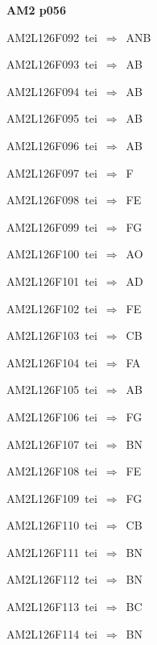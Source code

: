 \par\vfill\eject
{\bf\hfill AM2 p056\hfill\hbox{}}\par\bigskip
{\sixrm AM2L126F092\ {\sixit tei}\ }$\Rightarrow$\ ANB\par\smallskip
{\sixrm AM2L126F093\ {\sixit tei}\ }$\Rightarrow$\ AB\par\smallskip
{\sixrm AM2L126F094\ {\sixit tei}\ }$\Rightarrow$\ AB\par\smallskip
{\sixrm AM2L126F095\ {\sixit tei}\ }$\Rightarrow$\ AB\par\smallskip
{\sixrm AM2L126F096\ {\sixit tei}\ }$\Rightarrow$\ AB\par\smallskip
{\sixrm AM2L126F097\ {\sixit tei}\ }$\Rightarrow$\ F\par\smallskip
{\sixrm AM2L126F098\ {\sixit tei}\ }$\Rightarrow$\ FE\par\smallskip
{\sixrm AM2L126F099\ {\sixit tei}\ }$\Rightarrow$\ FG\par\smallskip
{\sixrm AM2L126F100\ {\sixit tei}\ }$\Rightarrow$\ AO\par\smallskip
{\sixrm AM2L126F101\ {\sixit tei}\ }$\Rightarrow$\ AD\par\smallskip
{\sixrm AM2L126F102\ {\sixit tei}\ }$\Rightarrow$\ FE\par\smallskip
{\sixrm AM2L126F103\ {\sixit tei}\ }$\Rightarrow$\ CB\par\smallskip
{\sixrm AM2L126F104\ {\sixit tei}\ }$\Rightarrow$\ FA\par\smallskip
{\sixrm AM2L126F105\ {\sixit tei}\ }$\Rightarrow$\ AB\par\smallskip
{\sixrm AM2L126F106\ {\sixit tei}\ }$\Rightarrow$\ FG\par\smallskip
{\sixrm AM2L126F107\ {\sixit tei}\ }$\Rightarrow$\ BN\par\smallskip
{\sixrm AM2L126F108\ {\sixit tei}\ }$\Rightarrow$\ FE\par\smallskip
{\sixrm AM2L126F109\ {\sixit tei}\ }$\Rightarrow$\ FG\par\smallskip
{\sixrm AM2L126F110\ {\sixit tei}\ }$\Rightarrow$\ CB\par\smallskip
{\sixrm AM2L126F111\ {\sixit tei}\ }$\Rightarrow$\ BN\par\smallskip
{\sixrm AM2L126F112\ {\sixit tei}\ }$\Rightarrow$\ BN\par\smallskip
{\sixrm AM2L126F113\ {\sixit tei}\ }$\Rightarrow$\ BC\par\smallskip
{\sixrm AM2L126F114\ {\sixit tei}\ }$\Rightarrow$\ BN\par\smallskip
